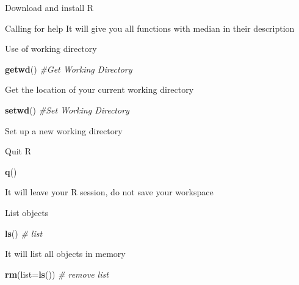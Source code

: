 \documentclass[
  ignorenonframetext,
]{beamer}
\newenvironment{Shaded}{\begin{snugshade}}{\end{snugshade}}
\newcommand{\CommentTok}[1]{\textcolor[rgb]{0.56,0.35,0.01}{\textit{#1}}}
\newcommand{\DataTypeTok}[1]{\textcolor[rgb]{0.13,0.29,0.53}{#1}}
\newcommand{\KeywordTok}[1]{\textcolor[rgb]{0.13,0.29,0.53}{\textbf{#1}}}
\newcommand{\NormalTok}[1]{#1}
\begin{document}
\begin{frame}[fragile]{Download and install R}
\begin{block}{Calling for help}
It will give you all functions with median in their description \WD

Use of working directory

\begin{Shaded}
\begin{Highlighting}[]
\KeywordTok{getwd}\NormalTok{()}
\CommentTok{#Get Working Directory}
\end{Highlighting}
\end{Shaded}

Get the location of your current working directory

\begin{Shaded}
\begin{Highlighting}[]
\KeywordTok{setwd}\NormalTok{()}
\CommentTok{#Set Working Directory}
\end{Highlighting}
\end{Shaded}

Set up a new working directory

\QUITR

\end{block}

\begin{block}{Quit R}

\begin{Shaded}
\begin{Highlighting}[]
\KeywordTok{q}\NormalTok{()}
\end{Highlighting}
\end{Shaded}

It will leave your R session, do not save your workspace

\OBJECTS

\end{block}

\begin{block}{List objects}

\begin{Shaded}
\begin{Highlighting}[]
\KeywordTok{ls}\NormalTok{()}
\CommentTok{# list}
\end{Highlighting}
\end{Shaded}

It will list all objects in memory

\begin{Shaded}
\begin{Highlighting}[]
\KeywordTok{rm}\NormalTok{(}\DataTypeTok{list=}\KeywordTok{ls}\NormalTok{())}
\CommentTok{# remove list}
\end{Highlighting}
\end{Shaded}


\end{block}
\end{frame}
\end{document}
